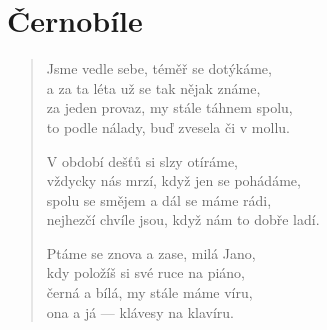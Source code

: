 \section{Černobíle}

\begin{verse}
Jsme vedle sebe, téměř se dotýkáme,\\
a za ta léta už se tak nějak známe,\\
za jeden provaz, my stále táhnem spolu,\\
to podle nálady, buď zvesela či v mollu.

V období dešťů si slzy otíráme,\\
vždycky nás mrzí, když jen se pohádáme,\\
spolu se smějem a dál se máme rádi,\\
nejhezčí chvíle jsou, když nám to dobře ladí.

Ptáme se znova a zase, milá Jano,\\
kdy položíš si své ruce na piáno,\\
černá a bílá, my stále máme víru,\\
ona a já — klávesy na klavíru.
\end{verse}


